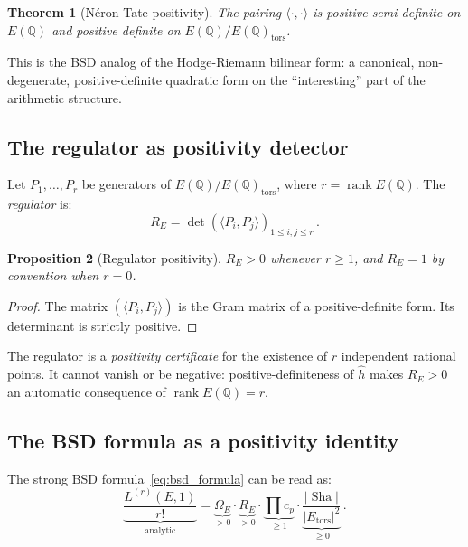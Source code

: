 \documentclass[aps,prd,twocolumn,superscriptaddress,nofootinbib]{revtex4-2}
\newtheorem{theorem}{Theorem}[section]
\newtheorem{proposition}[theorem]{Proposition}
\theoremstyle{definition}
\theoremstyle{remark}
\DeclareMathOperator{\rank}{rank}
\DeclareMathOperator{\Sha}{Sha}
\begin{document}
\begin{theorem}[N\'eron-Tate positivity]
\label{thm:NT_positive}
The pairing $\langle \cdot, \cdot \rangle$ is positive semi-definite on $E(\mathbb{Q})$ and positive definite on $E(\mathbb{Q})/E(\mathbb{Q})_{\mathrm{tors}}$.
\end{theorem}

This is the BSD analog of the Hodge-Riemann bilinear form: a canonical, non-degenerate, positive-definite quadratic form on the ``interesting'' part of the arithmetic structure.

\subsection{The regulator as positivity detector}

Let $P_1, \ldots, P_r$ be generators of $E(\mathbb{Q})/E(\mathbb{Q})_{\mathrm{tors}}$, where $r = \rank E(\mathbb{Q})$. The \textit{regulator} is:
\begin{equation}
R_E = \det\!\left(\langle P_i, P_j \rangle\right)_{1 \leq i,j \leq r}\,.
\label{eq:regulator}
\end{equation}

\begin{proposition}[Regulator positivity]
\label{prop:reg_positive}
$R_E > 0$ whenever $r \geq 1$, and $R_E = 1$ by convention when $r = 0$.
\end{proposition}

\begin{proof}
The matrix $(\langle P_i, P_j \rangle)$ is the Gram matrix of a positive-definite form. Its determinant is strictly positive.
\end{proof}

The regulator is a \textit{positivity certificate} for the existence of $r$ independent rational points. It cannot vanish or be negative: positive-definiteness of $\hat{h}$ makes $R_E > 0$ an automatic consequence of $\rank E(\mathbb{Q}) = r$.

\subsection{The BSD formula as a positivity identity}

The strong BSD formula~\eqref{eq:bsd_formula} can be read as:
\begin{equation}
\underbrace{\frac{L^{(r)}(E,1)}{r!}}_{\text{analytic}} = \underbrace{\Omega_E}_{> 0} \cdot \underbrace{R_E}_{> 0} \cdot \underbrace{\prod c_p}_{\geq 1} \cdot \underbrace{\frac{|\Sha|}{|E_{\mathrm{tors}}|^2}}_{\geq 0}\,.
\label{eq:bsd_positivity}
\end{equation}
\end{document}
